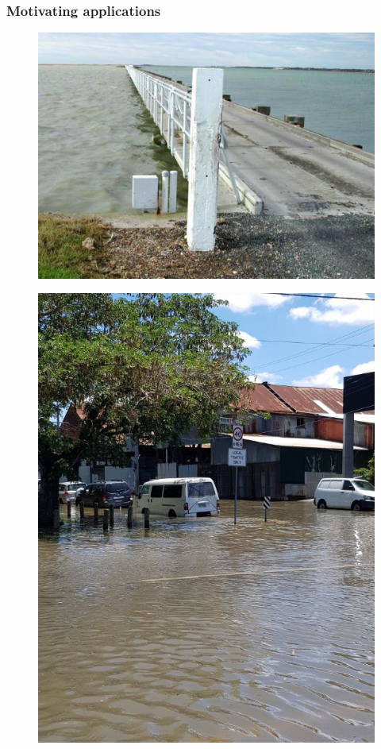 \begin{frame}
\frametitle{Motivating applications}
\begin{minipage}{0.45\textwidth}
    \begin{figure}      
    \includegraphics[height=\textheight]{figures/images/goolwa_ewe_island-environment_sa_gov_au.jpg}
    \end{figure}
\end{minipage}
\hfill
\begin{minipage}{0.45\textwidth}
    \begin{figure}      
     \includegraphics[height=\textheight]{figures/images/sunnyFlood_ClarkJan2018Brisbane.png}
    \end{figure} 
\end{minipage}

\end{frame}
